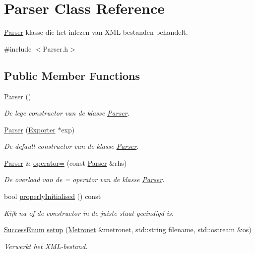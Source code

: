 \hypertarget{class_parser}{}\section{Parser Class Reference}
\label{class_parser}


\hyperlink{class_parser}{Parser} klasse die het inlezen van X\+M\+L-\/bestanden behandelt.  




{\ttfamily \#include $<$Parser.\+h$>$}

\subsection*{Public Member Functions}
\begin{DoxyCompactItemize}
\item 
\hyperlink{class_parser_a12234f6cd36b61af4b50c94a179422c1}{Parser} ()
\begin{DoxyCompactList}\small\item\em De lege constructor van de klasse \hyperlink{class_parser}{Parser}. \end{DoxyCompactList}\item 
\hyperlink{class_parser_a33d9b1246a34fd02cce180d960943d34}{Parser} (\hyperlink{class_exporter}{Exporter} $\ast$exp)
\begin{DoxyCompactList}\small\item\em De default constructor van de klasse \hyperlink{class_parser}{Parser}. \end{DoxyCompactList}\item 
\hyperlink{class_parser}{Parser} \& \hyperlink{class_parser_a622f2de84c005ebab29518949e6f6e62}{operator=} (const \hyperlink{class_parser}{Parser} \&rhs)
\begin{DoxyCompactList}\small\item\em De overload van de = operator van de klasse \hyperlink{class_parser}{Parser}. \end{DoxyCompactList}\item 
bool \hyperlink{class_parser_a888642fb1a08450ab26cd0f8c5ba02ad}{properly\+Initialised} () const 
\begin{DoxyCompactList}\small\item\em Kijk na of de constructor in de juiste staat geeindigd is. \end{DoxyCompactList}\item 
\hyperlink{_metronet_8h_ae69e1bf070c1c339170236b3fef70a4d}{Success\+Enum} \hyperlink{class_parser_a96b781357c53e72b5d4a12b5deb7a381}{setup} (\hyperlink{class_metronet}{Metronet} \&metronet, std\+::string filename, std\+::ostream \&os)
\begin{DoxyCompactList}\small\item\em Verwerkt het X\+M\+L-\/bestand. \end{DoxyCompactList}\end{DoxyCompactItemize}


